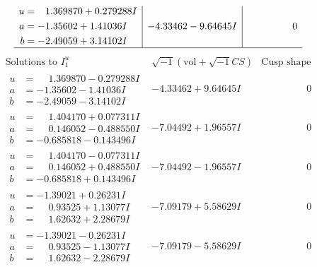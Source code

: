 \documentclass[1p]{elsarticle_modified}
\theoremstyle{definition}
\newcommand{\I}{\sqrt{-1}}
\begin{document}
$$\begin{array}{c|c|c}
\begin{aligned}
u &= \phantom{-}1.369870 + 0.279288 I \\
a &= -1.35602 + 1.41036 I \\
b &= -2.49059 + 3.14102 I\end{aligned}
 & -4.33462 - 9.64645 I & \phantom{-0.000000 } 0\\
 \hline 
 \end{array}$$\newpage$$\begin{array}{c|c|c}  
\text{Solutions to }I^u_{1}& \I (\text{vol} + \sqrt{-1}CS) & \text{Cusp shape}\\
 \hline 
\begin{aligned}
u &= \phantom{-}1.369870 - 0.279288 I \\
a &= -1.35602 - 1.41036 I \\
b &= -2.49059 - 3.14102 I\end{aligned}
 & -4.33462 + 9.64645 I & \phantom{-0.000000 } 0 \\ \hline\begin{aligned}
u &= \phantom{-}1.404170 + 0.077311 I \\
a &= \phantom{-}0.146052 - 0.488550 I \\
b &= -0.685818 - 0.143496 I\end{aligned}
 & -7.04492 + 1.96557 I & \phantom{-0.000000 } 0 \\ \hline\begin{aligned}
u &= \phantom{-}1.404170 - 0.077311 I \\
a &= \phantom{-}0.146052 + 0.488550 I \\
b &= -0.685818 + 0.143496 I\end{aligned}
 & -7.04492 - 1.96557 I & \phantom{-0.000000 } 0 \\ \hline\begin{aligned}
u &= -1.39021 + 0.26231 I \\
a &= \phantom{-}0.93525 + 1.13077 I \\
b &= \phantom{-}1.62632 + 2.28679 I\end{aligned}
 & -7.09179 + 5.58629 I & \phantom{-0.000000 } 0 \\ \hline\begin{aligned}
u &= -1.39021 - 0.26231 I \\
a &= \phantom{-}0.93525 - 1.13077 I \\
b &= \phantom{-}1.62632 - 2.28679 I\end{aligned}
 & -7.09179 - 5.58629 I & \phantom{-0.000000 } 0 \\ \hline\begin{aligned}

\end{aligned}
\end{array}$$
\end{document}
